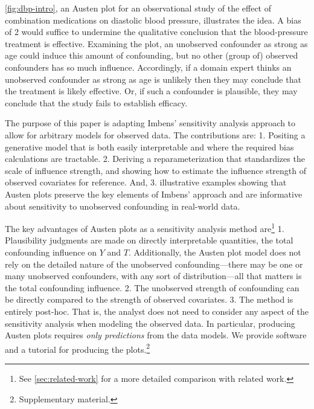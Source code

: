 \documentclass{article}
\begin{document}
\cref{fig:dbp-intro}, an Austen plot for an observational study of the effect of
combination medications on diastolic blood pressure, illustrates the idea. A bias of 2 would suffice to undermine the
qualitative conclusion that the blood-pressure treatment is effective. Examining the plot,
an unobserved confounder as strong as age could induce this amount of confounding,
but no other (group of) observed confounders has so much influence.
Accordingly, if a domain expert thinks an unobserved confounder as strong as age is unlikely
then they may conclude that the treatment is likely effective. Or, if such a confounder is plausible,
they may conclude that the study fails to establish efficacy.

The purpose of this paper is adapting Imbens' sensitivity analysis
approach to allow for arbitrary models for observed data.
The contributions are: 1. Positing a generative model that is
both easily interpretable and where the required bias calculations are tractable.
2. Deriving a reparameterization that standardizes the scale of influence strength,
and showing how to estimate the influence strength of observed covariates for reference.
And, 3. illustrative examples showing that Austen plots preserve the key elements of Imbens'
approach and are informative about sensitivity to unobserved confounding in real-world data.

The key advantages of Austen plots as a sensitivity analysis method are\footnote{See \cref{sec:related-work} for a more detailed comparison with related work.}
1. Plausibility judgments are made on directly
interpretable quantities, the total confounding influence on $Y$ and $T$.
Additionally, the Austen plot model does not rely on the detailed nature of the
unobserved confounding---there may be one or many unobserved confounders, with
any sort of distribution---all that matters is the total confounding influence.
2. The unobserved strength of confounding can be directly compared to the strength of observed covariates.
3. The method is entirely post-hoc.
That is, the analyst does not need to consider any aspect of the sensitivity
analysis when modeling the observed data.
In particular, producing Austen plots requires \emph{only predictions} from the data models.
We provide software and a tutorial for producing the plots.\footnote{Supplementary material.}

%
%
%
%
%
%
%
%
%
%

%
%
%
%
%
%
%
%
%
%
%
%
%
%
%
%

%
%
%
%
%
%
%
%
%
%
%
%
\end{document}
